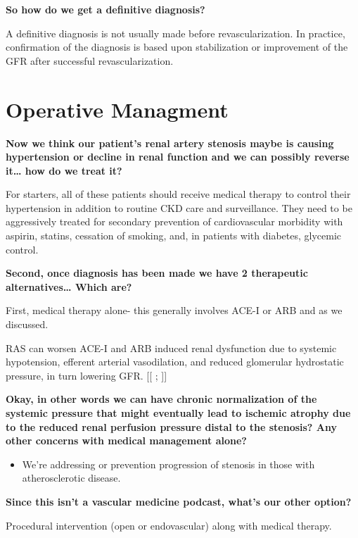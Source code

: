 \documentclass[
]{book}
\providecommand{\tightlist}{%
  \setlength{\itemsep}{0pt}\setlength{\parskip}{0pt}}
\begin{document}
\textbf{So how do we get a definitive diagnosis?}

A definitive diagnosis is not usually made before revascularization. In
practice, confirmation of the diagnosis is based upon stabilization or
improvement of the GFR after successful revascularization.

\hypertarget{operative-managment}{%
\section{Operative Managment}\label{operative-managment}}

\textbf{Now we think our patient's renal artery stenosis maybe is causing
hypertension or decline in renal function and we can possibly reverse
it\ldots{} how do we treat it?}

For starters, all of these patients should receive medical therapy to
control their hypertension in addition to routine CKD care and
surveillance. They need to be aggressively treated for secondary
prevention of cardiovascular morbidity with aspirin, statins, cessation
of smoking, and, in patients with diabetes, glycemic control.

\textbf{Second, once diagnosis has been made we have 2 therapeutic
alternatives\ldots{} Which are?}

First, medical therapy alone- this generally involves ACE-I or ARB and
as we discussed.

RAS can worsen ACE-I and ARB induced renal dysfunction due to systemic
hypotension, efferent arterial vasodilation, and reduced glomerular
hydrostatic pressure, in turn lowering GFR. {[}{[}
\citet{rickey125RenovascularDisease2019};
\citet{schoolwerthRenalConsiderationsAngiotensin2001}{]}{]}

\textbf{Okay, in other words we can have chronic normalization of the systemic
pressure that might eventually lead to ischemic atrophy due to the
reduced renal perfusion pressure distal to the stenosis? Any other
concerns with medical management alone?}

\begin{itemize}
\tightlist
\item
  We're addressing or prevention progression of stenosis in those with
  atherosclerotic disease.
\end{itemize}

\textbf{Since this isn't a vascular medicine podcast, what's our other
option?}

Procedural intervention (open or endovascular) along with medical
therapy.
\end{document}
